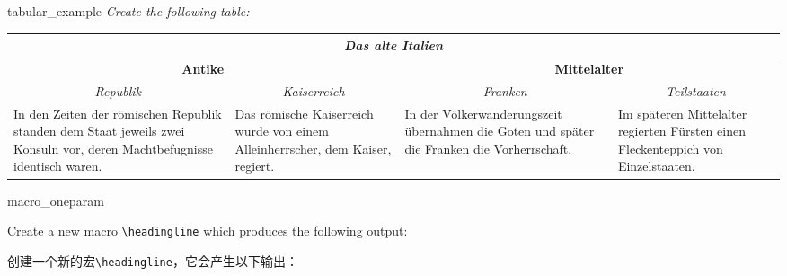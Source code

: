 \begin{dispExample}
\begin{texercise}{tabular_example}
\textit{Create the following table:}\par\smallskip%
\begin{tcboutputlisting}
\begin{tabular}{|p{3cm}|p{3cm}|p{3cm}|p{3cm}|}\hline
\multicolumn{4}{|c|}{\bfseries\itshape Das alte Italien}\\\hline
\multicolumn{2}{|c|}{\bfseries Antike} &
\multicolumn{2}{c|}{\bfseries Mittelalter}\\\hline
\multicolumn{1}{|c|}{\itshape Republik}&
\multicolumn{1}{c|}{\itshape Kaiserreich}&
\multicolumn{1}{c|}{\itshape Franken}&
\multicolumn{1}{c|}{\itshape Teilstaaten}\\\hline
In den Zeiten der r\"{o}mischen Republik standen dem Staat jeweils zwei
Konsuln vor, deren Machtbefugnisse identisch waren. &
Das r\"{o}mische Kaiserreich wurde von einem Alleinherrscher, dem Kaiser,
regiert.
& In der V\"{o}lkerwanderungszeit \"{u}bernahmen die Goten und sp\"{a}ter die
Franken die Vorherrschaft.
& Im sp\"{a}teren Mittelalter regierten F\"{u}rsten einen Fleckenteppich
von Einzelstaaten.\\\hline
\end{tabular}
\end{tcboutputlisting}
\tcbuselistingtext%
\end{texercise}
\end{dispExample}


\begin{dispExample}
\begin{texercise}{macro_oneparam}
\begin{tcboutputlisting}
\newcommand{\headingline}[1]{%
\begin{center}\Large\bfseries #1\end{center}}
\end{tcboutputlisting}
\tcbuselistingtext%

Create a new macro \verb+\headingline+ which produces the
following output:

创建一个新的宏\verb+\headingline+，它会产生以下输出：
\par\smallskip
\begin{tcbwritetemp}
\end{tcbwritetemp}
\tcbusetemplisting\tcbusetemp%
\end{texercise}
\end{dispExample}



